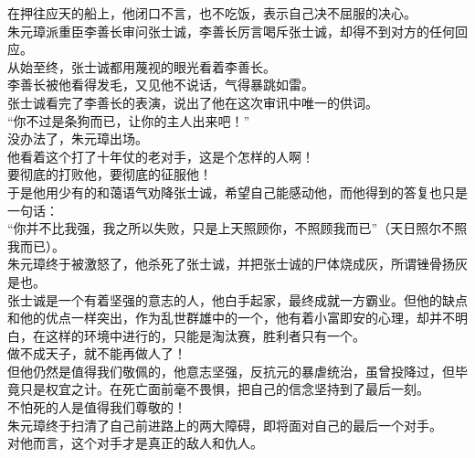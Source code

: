 \begin{multicols}{\theparacolNo}
在押往应天的船上，他闭口不言，也不吃饭，表示自己决不屈服的决心。\\

朱元璋派重臣李善长审问张士诚，李善长厉言喝斥张士诚，却得不到对方的任何回应。\\

从始至终，张士诚都用蔑视的眼光看着李善长。\\

李善长被他看得发毛，又见他不说话，气得暴跳如雷。\\

张士诚看完了李善长的表演，说出了他在这次审讯中唯一的供词。\\

“你不过是条狗而已，让你的主人出来吧！”\\

没办法了，朱元璋出场。\\

他看着这个打了十年仗的老对手，这是个怎样的人啊！\\

要彻底的打败他，要彻底的征服他！\\

于是他用少有的和蔼语气劝降张士诚，希望自己能感动他，而他得到的答复也只是一句话：\\

“你并不比我强，我之所以失败，只是上天照顾你，不照顾我而已”（天日照尔不照我而已）。\\

朱元璋终于被激怒了，他杀死了张士诚，并把张士诚的尸体烧成灰，所谓锉骨扬灰是也。\\

张士诚是一个有着坚强的意志的人，他白手起家，最终成就一方霸业。但他的缺点和他的优点一样突出，作为乱世群雄中的一个，他有着小富即安的心理，却并不明白，在这样的环境中进行的，只能是淘汰赛，胜利者只有一个。\\

做不成天子，就不能再做人了！\\

但他仍然是值得我们敬佩的，他意志坚强，反抗元的暴虐统治，虽曾投降过，但毕竟只是权宜之计。在死亡面前毫不畏惧，把自己的信念坚持到了最后一刻。\\

不怕死的人是值得我们尊敬的！\\

朱元璋终于扫清了自己前进路上的两大障碍，即将面对自己的最后一个对手。\\

对他而言，这个对手才是真正的敌人和仇人。\\
\ifnum{}
	\end{multicols}
\fi
\newpage
